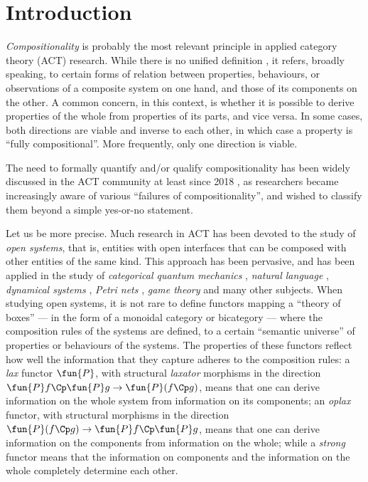 \section{Introduction}\label{sec: introduction}
%
%
\emph{Compositionality} is probably the most relevant principle in applied category theory (ACT) research.
While there is no unified definition \cite{Werning_Hinzen_Machery_2012, ghani2018compositional, coecke2021compositionality}, it refers, broadly speaking, to certain forms of relation between properties, behaviours, or observations of a composite system on one hand, and those of its components on the other.
A common concern, in this context, is whether it is possible to derive properties of the whole from properties of its parts, and vice versa.
In some cases, both directions are viable and inverse to each other, in which case a property is ``fully compositional''.
More frequently, only one direction is viable.

The need to formally quantify and/or qualify compositionality has been widely discussed in the ACT community at least since 2018 \cite{Genovese2018mod}, as researchers became increasingly aware of various ``failures of compositionality'', and wished to classify them beyond a simple yes-or-no statement.

Let us be more precise.
Much research in ACT has been devoted to the study of \emph{open systems}, that is, entities with open interfaces that can be composed with other entities of the same kind.
This approach has been pervasive, and has been applied in the study of \emph{categorical quantum mechanics} \cite{abramsky2009categorical}, \emph{natural language} \cite{coecke2021mathematics},  \emph{dynamical systems} \cite{Fong_Spivak_2019}, \emph{Petri nets} \cite{baez2021categories}, \emph{game theory} \cite{ghani2018compositional} and many other subjects.
When studying open systems, it is not rare to define functors mapping a ``theory of boxes''  --- in the form of a monoidal category or bicategory --- where the composition rules of the systems are defined, to a certain ``semantic universe'' of properties or behaviours of the systems.
The properties of these functors reflect how well the information that they capture adheres to the composition rules: a \emph{lax} functor $\fun{P}$, with structural \emph{laxator} morphisms in the direction $\fun{P}f \Cp \fun{P}g \to \fun{P}(f \Cp g)$, means that one can derive information on the whole system from information on its components; an \emph{oplax} functor, with structural morphisms in the direction $\fun{P}(f \Cp g) \to \fun{P}f \Cp \fun{P}g$, means that one can derive information on the components from information on the whole; while a \emph{strong} functor means that the information on components and the information on the whole completely determine each other.

